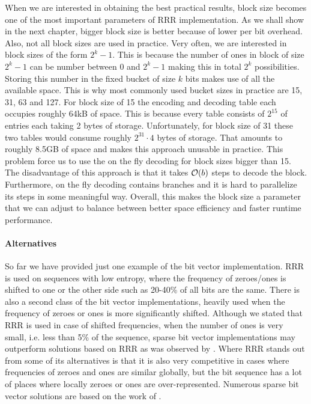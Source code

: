 When we are interested in obtaining the best practical results, block size becomes
one of the most important parameters of RRR implementation. As we shall show in the next
chapter, bigger block size is better because of lower per bit overhead. Also, not all block
sizes are used in practice. Very often, we are interested in block sizes of the form $2^k-1$.
This is because the number of ones in block of size $2^k-1$ can be number between 0 and $2^k-1$
making this in total $2^k$ possibilities. Storing this number in the fixed bucket of size
$k$ bits makes use of all the available space. This is why most commonly used bucket sizes in
practice are 15, 31, 63 and 127. For block size of 15 the encoding and decoding table
each occupies roughly 64kB of space. This is because every table consists of $2^{15}$ of entries
each taking 2 bytes of storage. Unfortunately, for block size of 31 these two tables would consume
roughly $2^{31}\cdot 4$ bytes of storage. That amounts to roughly 8.5GB of space and makes this approach
unusable in practice. This problem force us to use the on the fly decoding for block sizes
bigger than 15. The disadvantage of this approach is that it takes $\mathcal{O}(b)$ steps to decode the block.
Furthermore, on the fly decoding contains branches and it is hard to parallelize its steps in some meaningful
way. Overall, this makes the block size a parameter that we can adjust to balance between better space
efficiency and faster runtime performance.

\paragraph{Alternatives}

So far we have provided just one example of the bit vector implementation.
RRR is used on sequences with low entropy, where the frequency of zeroes/ones
is shifted to one or the other side such as 20-40\% of all bits are the same.
There is also a second class of the bit vector implementations, heavily
used when the frequency of zeroes or ones is more significantly shifted.
Although we stated that RRR is used in case of shifted frequencies, when the number
of ones is very small, i.e. less than 5\% of the sequence, sparse bit vector
implementations may outperform solutions based on RRR as was observed by \cite{navarro2012fast}.
Where RRR stands out from some of its alternatives is that it is also very competitive
in cases where frequencies of zeroes and ones are similar globally, but the bit
sequence has a lot of places where locally zeroes or ones are over-represented.
Numerous sparse bit vector solutions are based on the work of \cite{okanohara2007practical}.